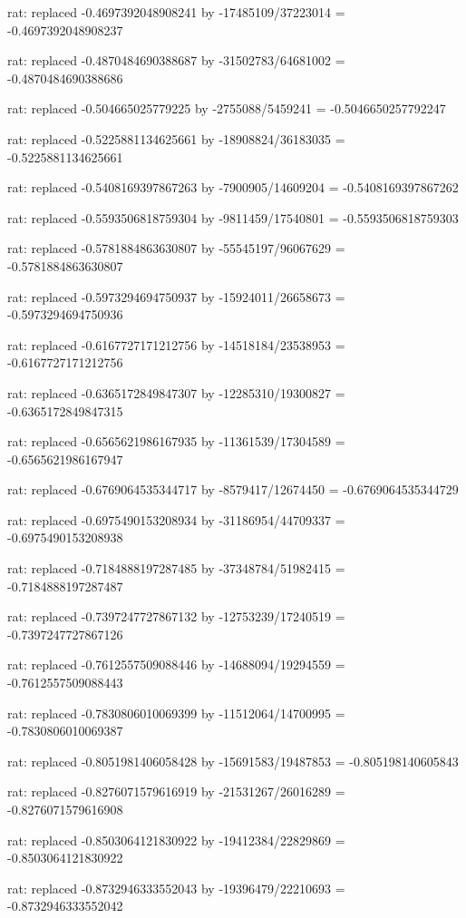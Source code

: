 \documentclass[a4paper,10pt]{article}
\begin{document}
\begin{eulernotebook}
\begin{eulercomment}
\begin{eulercomment}
\begin{eulercomment}
\begin{eulercomment}
\begin{eulercomment}
\begin{eulercomment}
\begin{eulercomment}
\begin{eulercomment}
\begin{eulercomment}
\begin{eulercomment}
\begin{eulercomment}
\begin{eulercomment}
\begin{eulercomment}
\begin{eulercomment}
\begin{eulercomment}
\begin{eulercomment}
\begin{euleroutput}
  rat: replaced -0.4697392048908241 by -17485109/37223014 = -0.4697392048908237
  
  rat: replaced -0.4870484690388687 by -31502783/64681002 = -0.4870484690388686
  
  rat: replaced -0.504665025779225 by -2755088/5459241 = -0.5046650257792247
  
  rat: replaced -0.5225881134625661 by -18908824/36183035 = -0.5225881134625661
  
  rat: replaced -0.5408169397867263 by -7900905/14609204 = -0.5408169397867262
  
  rat: replaced -0.5593506818759304 by -9811459/17540801 = -0.5593506818759303
  
  rat: replaced -0.5781884863630807 by -55545197/96067629 = -0.5781884863630807
  
  rat: replaced -0.5973294694750937 by -15924011/26658673 = -0.5973294694750936
  
  rat: replaced -0.6167727171212756 by -14518184/23538953 = -0.6167727171212756
  
  rat: replaced -0.6365172849847307 by -12285310/19300827 = -0.6365172849847315
  
  rat: replaced -0.6565621986167935 by -11361539/17304589 = -0.6565621986167947
  
  rat: replaced -0.6769064535344717 by -8579417/12674450 = -0.6769064535344729
  
  rat: replaced -0.6975490153208934 by -31186954/44709337 = -0.6975490153208938
  
  rat: replaced -0.7184888197287485 by -37348784/51982415 = -0.7184888197287487
  
  rat: replaced -0.7397247727867132 by -12753239/17240519 = -0.7397247727867126
  
  rat: replaced -0.7612557509088446 by -14688094/19294559 = -0.7612557509088443
  
  rat: replaced -0.7830806010069399 by -11512064/14700995 = -0.7830806010069387
  
  rat: replaced -0.8051981406058428 by -15691583/19487853 = -0.805198140605843
  
  rat: replaced -0.8276071579616919 by -21531267/26016289 = -0.8276071579616908
  
  rat: replaced -0.8503064121830922 by -19412384/22829869 = -0.8503064121830922
  
  rat: replaced -0.8732946333552043 by -19396479/22210693 = -0.8732946333552042
  

\end{euleroutput}
\end{eulercomment}
\end{eulercomment}
\end{eulercomment}
\end{eulercomment}
\end{eulercomment}
\end{eulercomment}
\end{eulercomment}
\end{eulercomment}
\end{eulercomment}
\end{eulercomment}
\end{eulercomment}
\end{eulercomment}
\end{eulercomment}
\end{eulercomment}
\end{eulercomment}
\end{eulercomment}
\end{eulernotebook}
\end{document}
